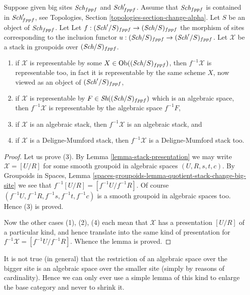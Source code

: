 \begin{lemma}
\label{lemma-change-big-site}
Suppose given big sites $\textit{Sch}_{fppf}$ and $\textit{Sch}'_{fppf}$.
Assume that $\textit{Sch}_{fppf}$ is contained in $\textit{Sch}'_{fppf}$,
see Topologies, Section \ref{topologies-section-change-alpha}.
Let $S$ be an object of $\textit{Sch}_{fppf}$. Let
Let $f : (\textit{Sch}'/S)_{fppf} \to (\textit{Sch}/S)_{fppf}$ the morphism
of sites corresponding to the inclusion functor
$u : (\textit{Sch}/S)_{fppf} \to (\textit{Sch}'/S)_{fppf}$.
Let $\mathcal{X}$ be a stack in groupoids over $(\textit{Sch}/S)_{fppf}$.
\begin{enumerate}
\item if $\mathcal{X}$ is representable by some
$X \in \text{Ob}((\textit{Sch}/S)_{fppf})$, then
$f^{-1}\mathcal{X}$ is representable too, in fact it is representable by the
same scheme $X$, now viewed as an object of $(\textit{Sch}'/S)_{fppf}$,
\item if $\mathcal{X}$ is representable by
$F \in \textit{Sh}((\textit{Sch}/S)_{fppf})$ which is
an algebraic space, then $f^{-1}\mathcal{X}$ is representable
by the algebraic space $f^{-1}F$,
\item if $\mathcal{X}$ is an algebraic stack, then $f^{-1}\mathcal{X}$
is an algebraic stack, and
\item if $\mathcal{X}$ is a Deligne-Mumford stack, then $f^{-1}\mathcal{X}$
is a Deligne-Mumford stack too.
\end{enumerate}
\end{lemma}

\begin{proof}
Let us prove (3). By
Lemma \ref{lemma-stack-presentation}
we may write $\mathcal{X} = [U/R]$ for some smooth
groupoid in algebraic spaces $(U, R, s, t, c)$. By
Groupoids in Spaces,
Lemma \ref{spaces-groupoids-lemma-quotient-stack-change-big-site}
we see that $f^{-1}[U/R] = [f^{-1}U/f^{-1}R]$.
Of course $(f^{-1}U, f^{-1}R, f^{-1}s, f^{-1}t, f^{-1}c)$
is a smooth groupoid in algebraic spaces too. Hence (3) is proved.

\medskip\noindent
Now the other cases (1), (2), (4) each mean that $\mathcal{X}$ has
a presentation $[U/R]$ of a particular kind, and hence translate into the
same kind of presentation for $f^{-1}\mathcal{X} = [f^{-1}U/f^{-1}R]$.
Whence the lemma is proved.
\end{proof}

\noindent
It is not true (in general) that the restriction of an algebraic space
over the bigger site is an algebraic space over the smaller site (simply
by reasons of cardinality). Hence we can only ever use a simple lemma of this
kind to enlarge the base category and never to shrink it.

